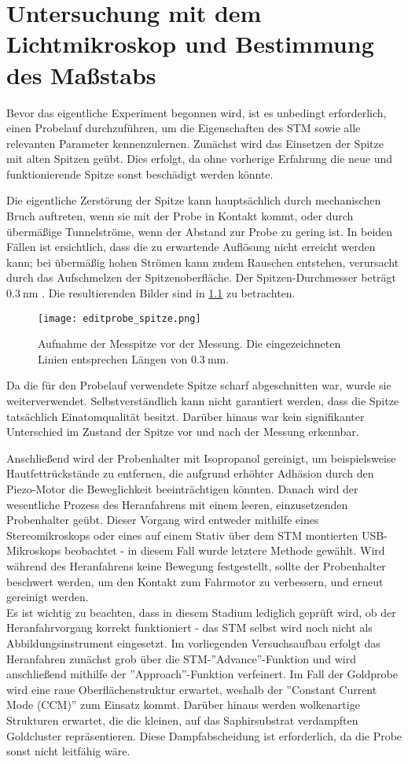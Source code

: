 \chapter{Untersuchung mit dem Lichtmikroskop und Bestimmung des Maßstabs}
Bevor das eigentliche Experiment begonnen wird, ist es unbedingt erforderlich, einen Probelauf durchzuführen, um die Eigenschaften des STM sowie alle relevanten Parameter kennenzulernen. 
Zunächst wird das Einsetzen der Spitze mit alten Spitzen geübt. Dies erfolgt, da ohne vorherige Erfahrung die neue und funktionierende Spitze sonst beschädigt werden könnte.

Die eigentliche Zerstörung der Spitze kann hauptsächlich durch mechanischen Bruch auftreten, wenn sie mit der Probe in Kontakt kommt, oder durch übermäßige Tunnelströme, wenn der Abstand zur Probe zu gering ist. 
In beiden Fällen ist ersichtlich, dass die zu erwartende Auflösung nicht erreicht werden kann; bei übermäßig hohen Strömen kann zudem Rauschen entstehen, verursacht durch das Aufschmelzen der Spitzenoberfläche. Der Spitzen-Durchmesser beträgt $\SI{0.3}{\nm}$ \cite{praktikum}. 
Die resultierenden Bilder sind in \cref{fig:Spitze} zu betrachten. 
\begin{figure}[htbp]
    \centering
    \texttt{[image: editprobe\_spitze.png]}
    \caption{Aufnahme der Messpitze vor der Messung. Die eingezeichneten Linien entsprechen Längen von $\SI{0.3}{\mm}$.}
    \label{fig:Spitze}
\end{figure}

Da die für den Probelauf verwendete Spitze scharf abgeschnitten war, wurde sie weiterverwendet. Selbstverständlich kann nicht garantiert werden, dass die Spitze tatsächlich Einatomqualität besitzt. 
Darüber hinaus war kein signifikanter Unterschied im Zustand der Spitze vor und nach der Messung erkennbar.

Anschließend wird der Probenhalter mit Isopropanol gereinigt, um beispielsweise Hautfettrückstände zu entfernen, die aufgrund erhöhter Adhäsion durch den Piezo-Motor die Beweglichkeit beeinträchtigen könnten. 
Danach wird der wesentliche Prozess des Heranfahrens mit einem leeren, einzusetzenden Probenhalter geübt. 
Dieser Vorgang wird entweder mithilfe eines Stereomikroskops oder eines auf einem Stativ über dem STM montierten USB-Mikroskops beobachtet - in diesem Fall wurde letztere Methode gewählt. 
Wird während des Heranfahrens keine Bewegung festgestellt, sollte der Probenhalter beschwert werden, um den Kontakt zum Fahrmotor zu verbessern, und erneut gereinigt werden.\\
Es ist wichtig zu beachten, dass in diesem Stadium lediglich geprüft wird, ob der Heranfahrvorgang korrekt funktioniert - das STM selbst wird noch nicht als Abbildungsinstrument eingesetzt.
Im vorliegenden Versuchsaufbau erfolgt das Heranfahren zunächst grob über die STM-''Advance''-Funktion und wird anschließend mithilfe der ''Approach''-Funktion verfeinert. 
Im Fall der Goldprobe wird eine raue Oberflächenstruktur erwartet, weshalb der ''Constant Current Mode (CCM)'' zum Einsatz kommt. Darüber hinaus werden wolkenartige Strukturen erwartet, die die kleinen, auf das Saphirsubstrat verdampften Goldcluster repräsentieren. 
Diese Dampfabscheidung ist erforderlich, da die Probe sonst nicht leitfähig wäre.

